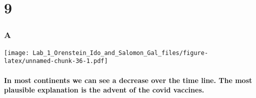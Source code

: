 \documentclass[
]{article}
\newenvironment{Shaded}{\begin{snugshade}}{\end{snugshade}}
\newcommand{\AttributeTok}[1]{\textcolor[rgb]{0.77,0.63,0.00}{#1}}
\newcommand{\FloatTok}[1]{\textcolor[rgb]{0.00,0.00,0.81}{#1}}
\newcommand{\FunctionTok}[1]{\textcolor[rgb]{0.00,0.00,0.00}{#1}}
\newcommand{\NormalTok}[1]{#1}
\newcommand{\OtherTok}[1]{\textcolor[rgb]{0.56,0.35,0.01}{#1}}
\newcommand{\SpecialCharTok}[1]{\textcolor[rgb]{0.00,0.00,0.00}{#1}}
\newcommand{\StringTok}[1]{\textcolor[rgb]{0.31,0.60,0.02}{#1}}
\begin{document}
\hypertarget{section-8}{%
\section{9}\label{section-8}}

\hypertarget{a-6}{%
\subsubsection{A}\label{a-6}}

\begin{Shaded}
\end{Shaded}

\texttt{[image: Lab\_1\_Orenstein\_Ido\_and\_Salomon\_Gal\_files/figure-latex/unnamed-chunk-36-1.pdf]}

\hypertarget{in-most-continents-we-can-see-a-decrease-over-the-time-line.-the-most-plausible-explanation-is-the-advent-of-the-covid-vaccines.}{%
\paragraph{In most continents we can see a decrease over the time line.
The most plausible explanation is the advent of the covid
vaccines.}\label{in-most-continents-we-can-see-a-decrease-over-the-time-line.-the-most-plausible-explanation-is-the-advent-of-the-covid-vaccines.}}
\end{document}
